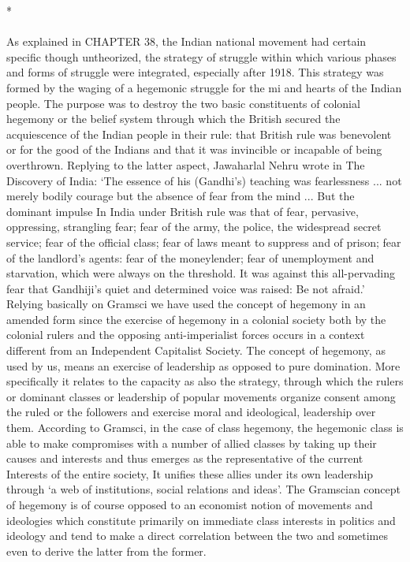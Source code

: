 \begin{center}*\end{center}

\paragraph*{}
As explained in CHAPTER 38, the Indian national movement had certain specific though untheorized, the strategy of struggle within which various phases and forms of struggle were integrated, especially after 1918. This strategy was formed by the waging of a hegemonic struggle for the mi and hearts of the Indian people. The purpose was to destroy the two basic constituents of colonial hegemony or the belief system through which the British secured the acquiescence of the Indian people in their rule: that British rule was benevolent or for the good of the Indians and that it was invincible or incapable of being overthrown. Replying to the latter aspect, Jawaharlal Nehru wrote in The Discovery of India: `The essence of his (Gandhi's) teaching was fearlessness ... not merely bodily courage but the absence of fear from the mind ... But the dominant impulse In India under British rule was that of fear, pervasive, oppressing, strangling fear; fear of the army, the police, the widespread secret service; fear of the official class; fear of laws meant to suppress and of prison; fear of the landlord's agents: fear of the money­lender; fear of unemployment and starvation, which were always on the threshold. It was against this all-pervading fear that Gandhiji's quiet and determined voice was raised: Be not afraid.' Relying basically on Gramsci we have used the concept of hegemony in an amended form since the exercise of hegemony in a colonial society both by the colonial rulers and the opposing anti-imperialist forces occurs in a context different from an Independent Capitalist Society. The concept of hegemony, as used by us, means an exercise of leadership as opposed to pure domination. More specifically it relates to the capacity as also the strategy, through which the rulers or dominant classes or leadership of popular movements organize consent among the ruled or the followers and exercise moral and ideological, leadership over them. According to Gramsci, in the case of class hegemony, the hegemonic class is able to make compromises with a number of allied classes by taking up their causes and interests and thus emerges as the representative of the current Interests of the entire society, It unifies these allies under its own leadership through `a web of institutions, social relations and ideas'. The Gramscian concept of hegemony is of course opposed to an economist notion of movements and ideologies which constitute primarily on immediate class interests in politics and ideology and tend to make a direct correlation between the two and sometimes even to derive the latter from the former.

